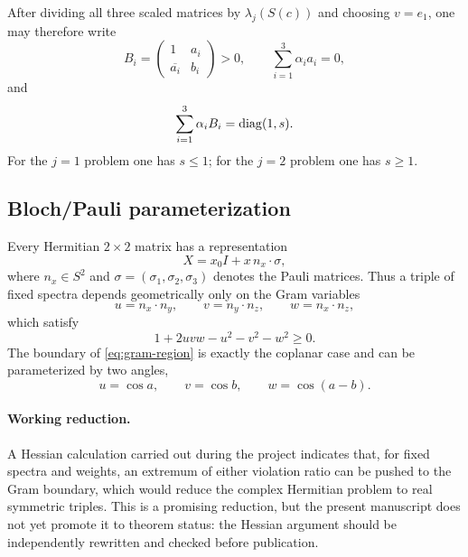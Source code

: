 After dividing all three scaled matrices by $\lambda_j(S(c))$ and choosing $v=e_1$, one may therefore write
\begin{equation}
B_i=
\begin{pmatrix}
1&a_i\\
\overline{a_i}&b_i
\end{pmatrix}>0,
\qquad
\sum_{i=1}^3\alpha_i a_i=0,
\label{eq:stationary-normal-form}
\end{equation}
and
\[
\sum_{i=1}^3\alpha_i B_i=\operatorname{diag}(1,s).
\]
For the $j=1$ problem one has $s\le1$; for the $j=2$ problem one has $s\ge1$.

\subsection{Bloch/Pauli parameterization}
Every Hermitian $2\times2$ matrix has a representation
\[
X=x_0I+x\,n_x\cdot\sigma,
\]
where $n_x\in S^2$ and $\sigma=(\sigma_1,\sigma_2,\sigma_3)$ denotes the Pauli matrices.  Thus a triple of fixed spectra depends geometrically only on the Gram variables
\[
u=n_x\cdot n_y,\qquad v=n_y\cdot n_z,\qquad w=n_x\cdot n_z,
\]
which satisfy
\begin{equation}
1+2uvw-u^2-v^2-w^2\ge0.
\label{eq:gram-region}
\end{equation}
The boundary of \eqref{eq:gram-region} is exactly the coplanar case and can be parameterized by two angles,
\[
u=\cos a,\qquad v=\cos b,\qquad w=\cos(a-b).
\]

\paragraph{Working reduction.}
\statusW{} A Hessian calculation carried out during the project indicates that, for fixed spectra and weights, an extremum of either violation ratio can be pushed to the Gram boundary, which would reduce the complex Hermitian problem to real symmetric triples.  This is a promising reduction, but the present manuscript does not yet promote it to theorem status: the Hessian argument should be independently rewritten and checked before publication.
